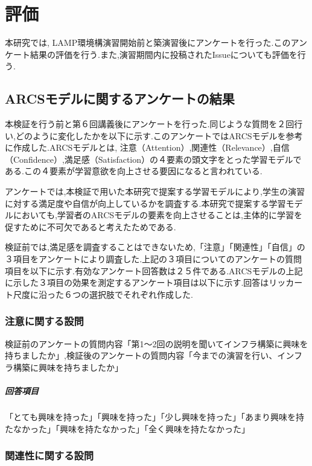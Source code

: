 \documentclass[11pt, a4paper]{jreport}
\begin{document}
\chapter{評価}\label{hyouka}

本研究では, LAMP環境構演習開始前と築演習後にアンケートを行った.このアンケート結果の評価を行う.また,演習期間内に投稿されたIssueについても評価を行う.

\section{ARCSモデルに関するアンケートの結果}

本検証を行う前と第６回講義後にアンケートを行った.同じような質問を２回行い,どのように変化したかを以下に示す.このアンケートではARCSモデルを参考に作成した.ARCSモデルとは, 注意（Attention）,関連性（Relevance）,自信（Confidence）,満足感（Satisfaction）の４要素の頭文字をとった学習モデルである.この４要素が学習意欲を向上させる要因になると言われている\cite{bib:arcs}.
 
アンケートでは,本検証で用いた本研究で提案する学習モデルにより,学生の演習に対する満足度や自信が向上しているかを調査する.本研究で提案する学習モデルにおいても,学習者のARCSモデルの要素を向上させることは,主体的に学習を促すために不可欠であると考えたためである.

検証前では,満足感を調査することはできないため,「注意」「関連性」「自信」の３項目をアンケートにより調査した.上記の３項目についてのアンケートの質問項目を以下に示す.有効なアンケート回答数は２５件である.ARCSモデルの上記に示した３項目の効果を測定するアンケート項目は以下に示す.回答はリッカート尺度に沿った６つの選択肢でそれぞれ作成した.

\subsection{注意に関する設問}

検証前のアンケートの質問内容「第1〜2回の説明を聞いてインフラ構築に興味を持ちましたか」,検証後のアンケートの質問内容「今までの演習を行い、インフラ構築に興味を持ちましたか」

\paragraph{回答項目}

「とても興味を持った」「興味を持った」「少し興味を持った」「あまり興味を持たなかった」「興味を持たなかった」「全く興味を持たなかった」

\subsection{関連性に関する設問}
\end{document}
